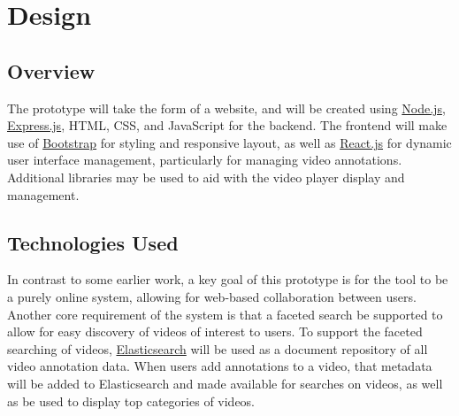 %
\chapter{Design}
\label{sec:design}


\section{Overview}
\label{sec:design:overview}

The prototype will take the form of a website, and will be created using \hyperref[glossary:node.js]{Node.js}, \hyperref[glossary:express.js]{Express.js}, HTML, CSS, and JavaScript for the backend.  The frontend will make use of \hyperref[glossary:bootstrap]{Bootstrap} for styling and responsive layout, as well as \hyperref[glossary:react.js]{React.js} for dynamic user interface management, particularly for managing video annotations.  Additional libraries may be used to aid with the video player display and management.

\section{Technologies Used}
\label{sec:overview:technologies-used}

In contrast to some earlier work, a key goal of this prototype is for the tool to be a purely online system, allowing for web-based collaboration between users.  Another core requirement of the system is that a faceted search be supported to allow for easy discovery of videos of interest to users.  To support the faceted searching of videos, \hyperref[glossary:elasticsearch]{Elasticsearch} will be used as a document repository of all video annotation data.  When users add annotations to a video, that metadata will be added to Elasticsearch and made available for searches on videos, as well as be used to display top categories of videos.

